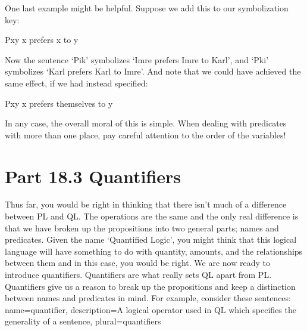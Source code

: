 One last example might be helpful. Suppose we add this to our symbolization key:
\begin{ekey}
\item[Pxy] x prefers x to y
\end{ekey}
Now the sentence ‘Pik’ symbolizes ‘Imre prefers Imre to Karl’, and ‘Pki’ symbolizes ‘Karl prefers Karl to Imre’. And note that we could have achieved the same effect, if we had instead specified:
\begin{ekey}
\item[Pxy] x prefers themselves to y
\end{ekey}
In any case, the overall moral of this is simple. When dealing with predicates with more than one place, pay careful attention to the order of the variables!
\section{Part 18.3 Quantifiers}
Thus far, you would be right in thinking that there isn't much of a difference between PL and QL. The operations are the same and the only real difference is that we have broken up the propositions into two general parts; names and predicates. Given the name ‘Quantified Logic', you might think that this logical language will have something to do with quantity, amounts, and the relationships between them and in this case, you would be right. We are now ready to introduce \glspl{quantifier}. Quantifiers are what really sets QL apart from PL. Quantifiers give us a reason to break up the propositions and keep a distinction between names and predicates in mind. For example, consider these sentences:
{
name=quantifier,
description={A logical operator used in QL which specifies the generality of a sentence},
plural=quantifiers
}


